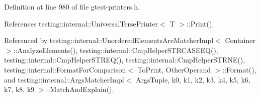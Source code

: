 Definition at line 980 of file gtest-\/printers.\+h.



References testing\+::internal\+::\+Universal\+Terse\+Printer$<$ T $>$\+::\+Print().



Referenced by testing\+::internal\+::\+Unordered\+Elements\+Are\+Matcher\+Impl$<$ Container $>$\+::\+Analyze\+Elements(), testing\+::internal\+::\+Cmp\+Helper\+S\+T\+R\+C\+A\+S\+E\+E\+Q(), testing\+::internal\+::\+Cmp\+Helper\+S\+T\+R\+E\+Q(), testing\+::internal\+::\+Cmp\+Helper\+S\+T\+R\+N\+E(), testing\+::internal\+::\+Format\+For\+Comparison$<$ To\+Print, Other\+Operand $>$\+::\+Format(), and testing\+::internal\+::\+Args\+Matcher\+Impl$<$ Args\+Tuple, k0, k1, k2, k3, k4, k5, k6, k7, k8, k9 $>$\+::\+Match\+And\+Explain().


